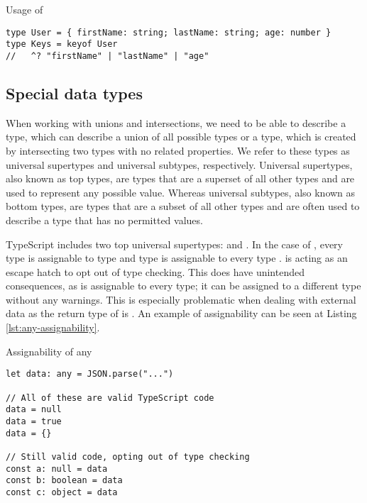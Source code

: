 \begin{listing}[ht]
  \caption{Usage of }\label{lst:keyof}
  \begin{verbatim}
type User = { firstName: string; lastName: string; age: number }
type Keys = keyof User
//   ^? "firstName" | "lastName" | "age"
\end{verbatim}
\end{listing}



\subsection{Special data types}

When working with unions and intersections, we need to be able to describe a type, which can describe a union of all possible types or a type, which is created by intersecting two types with no related properties. We refer to these types as universal supertypes and universal subtypes, respectively. Universal supertypes, also known as top types, are types that are a superset of all other types and are used to represent any possible value. Whereas universal subtypes, also known as bottom types, are types that are a subset of all other types and are often used to describe a type that has no permitted values.

TypeScript includes two top universal supertypes:  and . In the case of , every type is assignable to type  and type  is assignable to every type \cite{TopTypesAny}.  is acting as an escape hatch to opt out of type checking. This does have unintended consequences, as  is assignable to every type; it can be assigned to a different type without any warnings. This is especially problematic when dealing with external data as the return type of  is . An example of assignability can be seen at Listing \ref{lst:any-assignability}.

\begin{listing}[ht]
  \caption{Assignability of any}\label{lst:any-assignability}
  \begin{verbatim}
let data: any = JSON.parse("...") 

// All of these are valid TypeScript code
data = null
data = true
data = {}

// Still valid code, opting out of type checking
const a: null = data
const b: boolean = data
const c: object = data
  \end{verbatim}
\end{listing}

